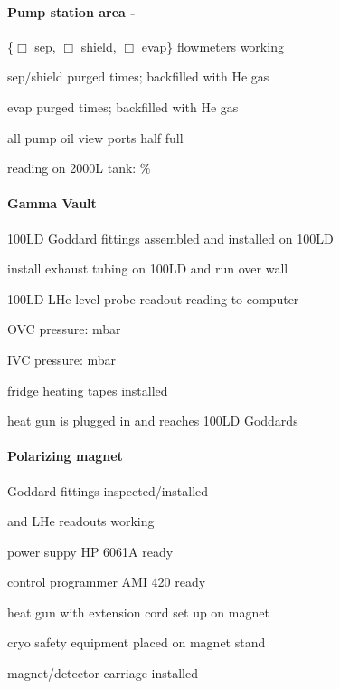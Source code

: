 \begin{appendices}
\begin{minipage}{\textwidth}
\paragraph{Pump station area - \hef}
\begin{checklist}
 \item \{$\Box$ sep, $\Box$ shield, $\Box$ evap\} flowmeters working
 \item sep/shield purged \blankprompt{} times; backfilled with He gas
 \item evap purged \blankprompt{} times; backfilled with He gas
 \item all pump oil view ports half full
 \item reading on 2000L \lnn{} tank: \blankprompt\%
\end{checklist}
\end{minipage}

\begin{minipage}{\textwidth}
\paragraph{Gamma Vault}
\begin{checklist}
 \item 100LD Goddard fittings assembled and installed on 100LD
 \item install exhaust tubing on 100LD and run over wall
 \item 100LD LHe level probe readout reading to computer
 \item OVC pressure: \blankprompt mbar
 \item IVC pressure: \blankprompt mbar
 \item fridge heating tapes installed
 \item heat gun is plugged in and reaches 100LD Goddards 
\end{checklist}
\end{minipage}

\begin{minipage}{\textwidth}
\paragraph{Polarizing magnet}
\begin{checklist}
\item Goddard fittings inspected/installed
\item \lnn{} and LHe readouts working
\item power suppy HP 6061A ready
\item control programmer AMI 420 ready
\item heat gun with extension cord set up on magnet
\item cryo safety equipment placed on magnet stand
\item magnet/detector carriage installed
\end{checklist}
\end{minipage}


\end{appendices}
